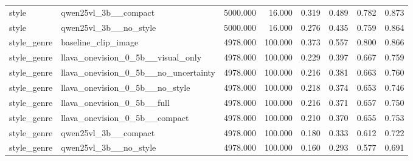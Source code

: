 \begin{tabular}{llrrrrrr}
style & qwen25vl_3b__compact & 5000.000 & 16.000 & 0.319 & 0.489 & 0.782 & 0.873 \\
style & qwen25vl_3b__no_style & 5000.000 & 16.000 & 0.276 & 0.435 & 0.759 & 0.864 \\
style_genre & baseline_clip_image & 4978.000 & 100.000 & 0.373 & 0.557 & 0.800 & 0.866 \\
style_genre & llava_onevision_0_5b__visual_only & 4978.000 & 100.000 & 0.229 & 0.397 & 0.667 & 0.759 \\
style_genre & llava_onevision_0_5b__no_uncertainty & 4978.000 & 100.000 & 0.216 & 0.381 & 0.663 & 0.760 \\
style_genre & llava_onevision_0_5b__no_style & 4978.000 & 100.000 & 0.218 & 0.374 & 0.653 & 0.746 \\
style_genre & llava_onevision_0_5b__full & 4978.000 & 100.000 & 0.216 & 0.371 & 0.657 & 0.750 \\
style_genre & llava_onevision_0_5b__compact & 4978.000 & 100.000 & 0.210 & 0.370 & 0.655 & 0.753 \\
style_genre & qwen25vl_3b__compact & 4978.000 & 100.000 & 0.180 & 0.333 & 0.612 & 0.722 \\
style_genre & qwen25vl_3b__no_style & 4978.000 & 100.000 & 0.160 & 0.293 & 0.577 & 0.691 \\
\bottomrule
\end{tabular}
